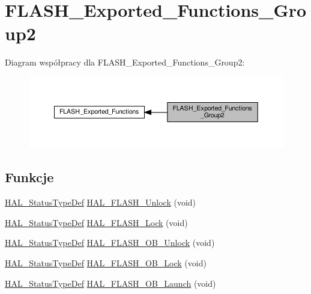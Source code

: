 \hypertarget{group___f_l_a_s_h___exported___functions___group2}{}\section{F\+L\+A\+S\+H\+\_\+\+Exported\+\_\+\+Functions\+\_\+\+Group2}
\label{group___f_l_a_s_h___exported___functions___group2}
Diagram współpracy dla F\+L\+A\+S\+H\+\_\+\+Exported\+\_\+\+Functions\+\_\+\+Group2\+:\nopagebreak
\begin{figure}[H]
\begin{center}
\leavevmode
\includegraphics[width=350pt]{group___f_l_a_s_h___exported___functions___group2}
\end{center}
\end{figure}
\subsection*{Funkcje}
\begin{DoxyCompactItemize}
\item 
\hyperlink{stm32f4xx__hal__def_8h_a63c0679d1cb8b8c684fbb0632743478f}{H\+A\+L\+\_\+\+Status\+Type\+Def} \hyperlink{group___f_l_a_s_h___exported___functions___group2_ga23d4ff42a8873bac585c92ce4f633747}{H\+A\+L\+\_\+\+F\+L\+A\+S\+H\+\_\+\+Unlock} (void)
\item 
\hyperlink{stm32f4xx__hal__def_8h_a63c0679d1cb8b8c684fbb0632743478f}{H\+A\+L\+\_\+\+Status\+Type\+Def} \hyperlink{group___f_l_a_s_h___exported___functions___group2_gae07eeca0b0aa9d5047f8df88d82f4bcd}{H\+A\+L\+\_\+\+F\+L\+A\+S\+H\+\_\+\+Lock} (void)
\item 
\hyperlink{stm32f4xx__hal__def_8h_a63c0679d1cb8b8c684fbb0632743478f}{H\+A\+L\+\_\+\+Status\+Type\+Def} \hyperlink{group___f_l_a_s_h___exported___functions___group2_ga6e8f380b7a938592f0b6f05d0ebf69c3}{H\+A\+L\+\_\+\+F\+L\+A\+S\+H\+\_\+\+O\+B\+\_\+\+Unlock} (void)
\item 
\hyperlink{stm32f4xx__hal__def_8h_a63c0679d1cb8b8c684fbb0632743478f}{H\+A\+L\+\_\+\+Status\+Type\+Def} \hyperlink{group___f_l_a_s_h___exported___functions___group2_ga3ff599bd7eba88f7a169a537ccbf3e3f}{H\+A\+L\+\_\+\+F\+L\+A\+S\+H\+\_\+\+O\+B\+\_\+\+Lock} (void)
\item 
\hyperlink{stm32f4xx__hal__def_8h_a63c0679d1cb8b8c684fbb0632743478f}{H\+A\+L\+\_\+\+Status\+Type\+Def} \hyperlink{group___f_l_a_s_h___exported___functions___group2_ga046c539c76aaae3d487d59193f74c9db}{H\+A\+L\+\_\+\+F\+L\+A\+S\+H\+\_\+\+O\+B\+\_\+\+Launch} (void)
\end{DoxyCompactItemize}


